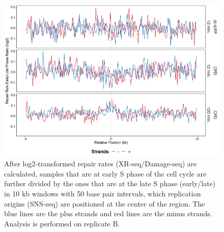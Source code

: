 \begin{figure}[H]
\begin{center}
\includegraphics[width=\textwidth]{Chapters/7_appendix/figures/supfig55}
\caption[Repair rate early/late ratio of replication origins in 10 kb (replicate B).]{After log2-transformed repair rates (XR-seq/Damage-seq) are calculated, samples that are at early S phase of the cell cycle are further divided by the ones that are at the late S phase (early/late) in 10 kb windows with 50 base pair intervals, which replication origins (SNS-seq) are positioned at the center of the region. The blue lines are the plus strands and red lines are the minus strands. Analysis is performed on replicate B.}
\label{supfig:rrel10snsB}
\end{center}
\end{figure}

